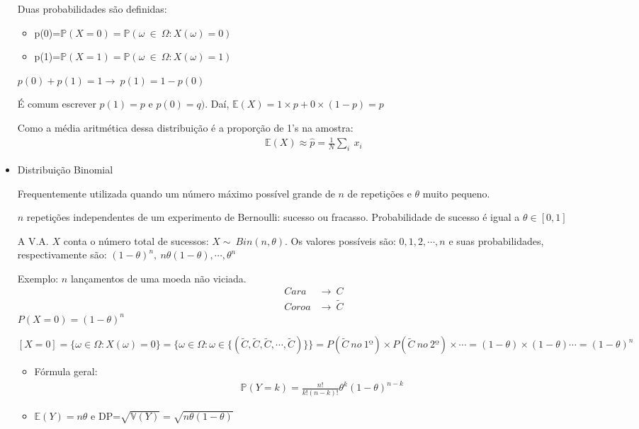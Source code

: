\documentclass[11pt,a4paper]{book}
\begin{document}
\begin{itemize}
		Duas probabilidades são definidas:
		\begin{itemize}
			\item p(0)=$\mathbb{P}(X=0)=\mathbb{P}(\omega~\in~\Omega:X(\omega)=0)$
			\item p(1)=$\mathbb{P}(X=1)=\mathbb{P}(\omega~\in~\Omega:X(\omega)=1)$
		\end{itemize}
		
		$p(0)+p(1)=1\rightarrow~p(1)=1-p(0)$
		
		É comum escrever $p(1)=p$ e $p(0)=q)$.
		Daí, $\mathbb{E}(X)=1\times p+0\times(1-p)=p$
		
		Como a média aritmética dessa distribuição é a proporção de 1's na amostra:
		\begin{align*}
			\mathbb{E}(X)\approx\hat{p}=\frac{1}{N}\sum_i~x_i
		\end{align*}
		
		\item Distribuição Binomial
		
		Frequentemente utilizada quando um número máximo possível grande de $n$ de repetições e $\theta$ muito pequeno.
		
		$n$ repetições independentes de um experimento de Bernoulli: sucesso ou fracasso.
		Probabilidade de sucesso é igual a $\theta\in[0,1]$ 
		
		A V.A. $X$ conta o número total de sucessos: $X\sim~Bin(n,\theta)$.
		Os valores possíveis são: $0,1,2,\cdots,n$ e suas probabilidades, respectivamente são: $(1-\theta)^n,~n\theta(1-\theta),\cdots,\theta^n$
		
		Exemplo: $n$ lançamentos de uma moeda não viciada.
		\begin{align*}
			Cara&\rightarrow~C\\
			Coroa&\rightarrow~\tilde{C}
		\end{align*}
		$P(X=0) = (1-\theta)^{n}$
			
		$[X=0]=\lbrace\omega \in \Omega:X(\omega)=0\rbrace=\lbrace\omega \in \Omega: \omega \in \lbrace(\tilde{C},\tilde{C},\tilde{C},\cdots,\tilde{C})\rbrace\rbrace=P(\tilde{C}~no~1º)\times P(\tilde{C}~no~2º)\times \cdots = (1-\theta)\times(1-\theta)\cdots = (1-\theta)^{n}$
		
		\begin{itemize}
			\item Fórmula geral:
			\begin{align*}
				\mathbb{P}(Y=k)=\frac{n!}{k!(n-k)!}\theta^k(1-\theta)^{n-k}
			\end{align*}
			\item $\mathbb{E}(Y)=n\theta$ e DP=$\sqrt{\mathbb{V}(Y)}=\sqrt{n\theta(1-\theta)}$
		\end{itemize}
		

\end{itemize}
\end{document}
